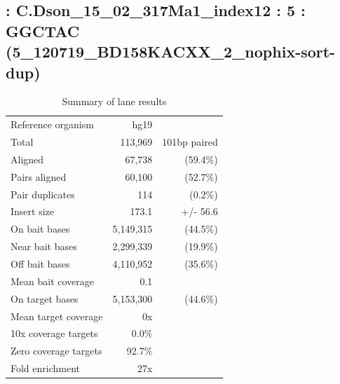 \documentclass{article}
\begin{document}
    
\subsection*{ : C.Dson\_15\_02\_317Ma1\_index12 : 5 : GGCTAC (5\_120719\_BD158KACXX\_2\_nophix-sort-dup)}

    \begin{table}[h]
    \centering
    \begin{tabular}{|l|rr|}
    \hline
            Reference organism & hg19 &  \\ 
            Total & 113,969 & 101bp paired \\ 
            Aligned & 67,738 & (59.4\%) \\ 
            Pairs aligned & 60,100 & (52.7\%) \\ 
            Pair duplicates & 114 & (0.2\%) \\ 
            Insert size & 173.1 & +/- 56.6 \\ 
            \hline
            On bait bases & 5,149,315 & (44.5\%) \\ 
            Near bait bases & 2,299,339 & (19.9\%) \\ 
            Off bait bases & 4,110,952 & (35.6\%) \\ 
            Mean bait coverage & 0.1 &  \\ 
            On target bases & 5,153,300 & (44.6\%) \\ 
            Mean target coverage & 0x &  \\ 
            10x coverage targets & 0.0\% &  \\ 
            Zero coverage targets & 92.7\% &  \\ 
            Fold enrichment & 27x &  \\ 
    \hline
    \end{tabular}
    \caption{Summary of lane results}
    \end{table}
\end{document}
